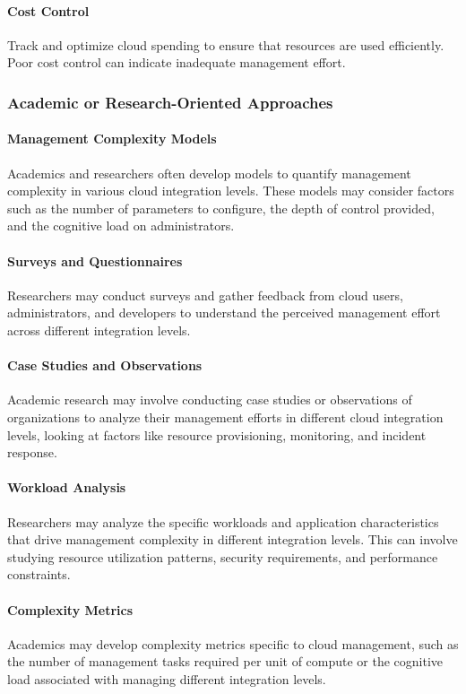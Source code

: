 \paragraph{Cost Control}
Track and optimize cloud spending to ensure that resources are used efficiently. 
Poor cost control can indicate inadequate management effort.

\subsubsection{Academic or Research-Oriented Approaches}

\paragraph{Management Complexity Models}
Academics and researchers often develop models to quantify management complexity in various cloud integration levels. 
These models may consider factors such as the number of parameters to configure, the depth of control provided, and the cognitive load on administrators.

\paragraph{Surveys and Questionnaires}
Researchers may conduct surveys and gather feedback from cloud users, administrators, 
and developers to understand the perceived management effort across different integration levels.


\paragraph{Case Studies and Observations}
Academic research may involve conducting case studies or observations of organizations to analyze their management efforts in different cloud integration levels, looking at factors like resource provisioning, monitoring, and incident response.


\paragraph{Workload Analysis}
Researchers may analyze the specific workloads and application characteristics that drive management complexity in different integration levels. 
This can involve studying resource utilization patterns, security requirements, and performance constraints.

\paragraph{Complexity Metrics}     
Academics may develop complexity metrics specific to cloud management, such as the number of management tasks required per unit of compute or 
the cognitive load associated with managing different integration levels.

